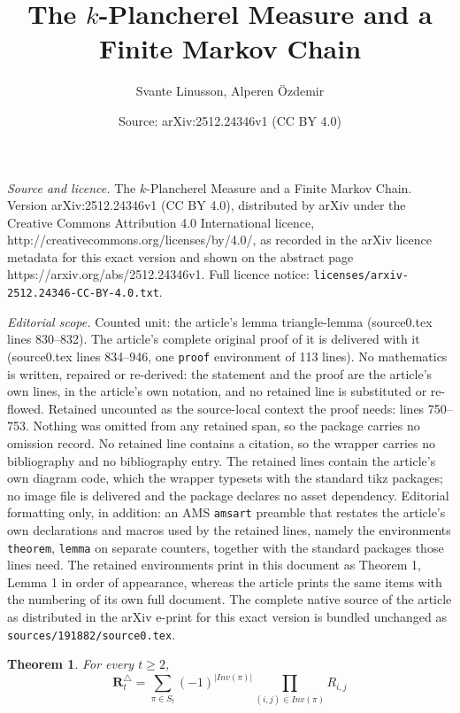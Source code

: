 \documentclass[10pt,a4paper]{amsart}
\title{The $k$-Plancherel Measure and a Finite Markov Chain}
\author{Svante Linusson, Alperen \"Ozdemir}
\date{Source: arXiv:2512.24346v1 (CC BY 4.0)}
\newtheorem{theorem}{Theorem}
\begin{document}
\maketitle

\noindent\emph{Source and licence.} The $k$-Plancherel Measure and a Finite Markov Chain. Version arXiv:2512.24346v1 (CC BY 4.0), distributed by arXiv under the Creative Commons Attribution 4.0 International licence, http://creativecommons.org/licenses/by/4.0/, as recorded in the arXiv licence metadata for this exact version and shown on the abstract page https://arxiv.org/abs/2512.24346v1. Full licence notice: \texttt{licenses/arxiv-2512.24346-CC-BY-4.0.txt}.\par\smallskip

\noindent\textit{Editorial scope.} Counted unit: the article's lemma triangle-lemma (source0.tex lines 830--832). The article's complete original proof of it is delivered with it (source0.tex lines 834--946, one \texttt{proof} environment of 113 lines). No mathematics is written, repaired or re-derived: the statement and the proof are the article's own lines, in the article's own notation, and no retained line is substituted or re-flowed.  Retained uncounted as the source-local context the proof needs: lines 750--753.  Nothing was omitted from any retained span, so the package carries no omission record.  No retained line contains a citation, so the wrapper carries no bibliography and no bibliography entry.  The retained lines contain the article's own diagram code, which the wrapper typesets with the standard tikz packages; no image file is delivered and the package declares no asset dependency.  Editorial formatting only, in addition: an AMS \texttt{amsart} preamble that restates the article's own declarations and macros used by the retained lines, namely the environments \texttt{theorem}, \texttt{lemma} on separate counters, together with the standard packages those lines need.  The retained environments print in this document as Theorem 1, Lemma 1 in order of appearance, whereas the article prints the same items with the numbering of its own full document.  The complete native source of the article as distributed in the arXiv e-print for this exact version is bundled unchanged as \texttt{sources/191882/source0.tex}.
\begin{theorem}\label{thm:inversions} For every $t\ge 2$,
    \[\mathbf{R}^\triangle_t=\sum_{\pi\in S_{t}} (-1)^{|Inv(\pi)|}\prod_{(i,j)\in Inv(\pi)} R_{i,j}
    \]
\end{theorem}
\end{document}
